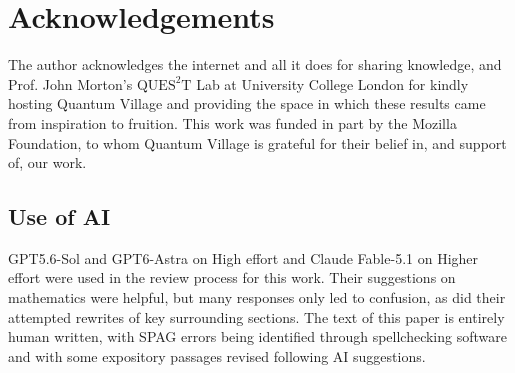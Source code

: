 \documentclass[10pt, a4paper]{article}
\begin{document}
\section{Acknowledgements}

The author acknowledges the internet and all it does for sharing knowledge, and Prof. John Morton's $\mathrm{QUES^2T}$ Lab at University College London for kindly hosting Quantum Village and providing the space in which these results came from inspiration to fruition. This work was funded in part by the Mozilla Foundation, to whom Quantum Village is grateful for their belief in, and support of, our work.

\subsection{Use of AI}

GPT5.6-Sol and GPT6-Astra on High effort and Claude Fable-5.1 on Higher effort were used in the review process for this work. Their suggestions on mathematics were helpful, but many responses only led to confusion, as did their attempted rewrites of key surrounding sections. The text of this paper is entirely human written, with SPAG errors being identified through spellchecking software and with some expository passages revised following AI suggestions.



\end{document}
